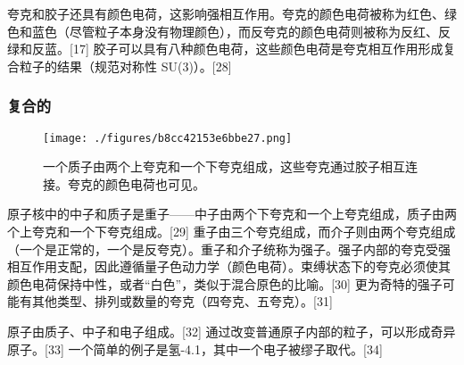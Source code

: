 夸克和胶子还具有颜色电荷，这影响强相互作用。夸克的颜色电荷被称为红色、绿色和蓝色（尽管粒子本身没有物理颜色），而反夸克的颜色电荷则被称为反红、反绿和反蓝。[17] 胶子可以具有八种颜色电荷，这些颜色电荷是夸克相互作用形成复合粒子的结果（规范对称性 SU(3)）。[28]
\subsubsection{复合的}
\begin{figure}[ht]
\centering
\texttt{[image: ./figures/b8cc42153e6bbe27.png]}
\caption{一个质子由两个上夸克和一个下夸克组成，这些夸克通过胶子相互连接。夸克的颜色电荷也可见。} \label{fig_Partic_4}
\end{figure}
原子核中的中子和质子是重子——中子由两个下夸克和一个上夸克组成，质子由两个上夸克和一个下夸克组成。[29] 重子由三个夸克组成，而介子则由两个夸克组成（一个是正常的，一个是反夸克）。重子和介子统称为强子。强子内部的夸克受强相互作用支配，因此遵循量子色动力学（颜色电荷）。束缚状态下的夸克必须使其颜色电荷保持中性，或者“白色”，类似于混合原色的比喻。[30] 更为奇特的强子可能有其他类型、排列或数量的夸克（四夸克、五夸克）。[31]

原子由质子、中子和电子组成。[32] 通过改变普通原子内部的粒子，可以形成奇异原子。[33] 一个简单的例子是氢-4.1，其中一个电子被缪子取代。[34]